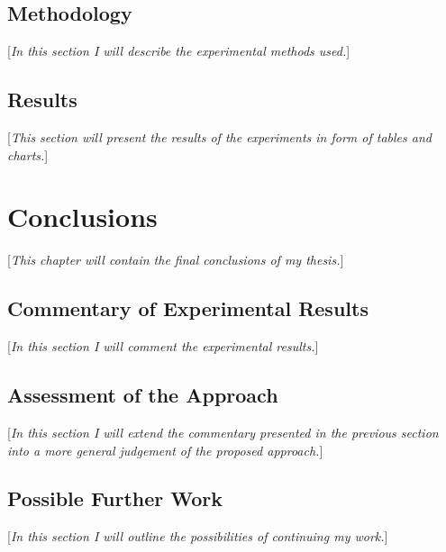 \documentclass{pracamgr}
\begin{document}
\section{Methodology}
[\textit{In this section I will describe the experimental methods used.}]

\section{Results}
[\textit{This section will present the results of the experiments in form of tables and charts.}]

\chapter{Conclusions}
[\textit{This chapter will contain the final conclusions of my thesis.}]

\section{Commentary of Experimental Results}
[\textit{In this section I will comment the experimental results.}]

\section{Assessment of the Approach}
[\textit{In this section I will extend the commentary presented in the previous section into a more general judgement of the proposed approach.}]

\section{Possible Further Work}
[\textit{In this section I will outline the possibilities of continuing my work.}]

\printbibliography[heading=bibintoc]
\end{document}

